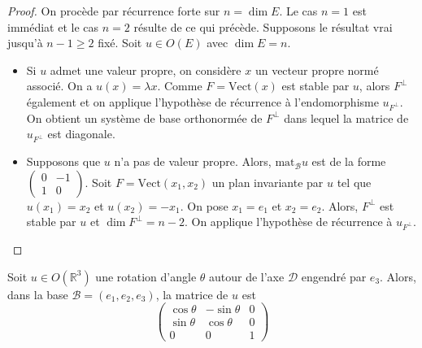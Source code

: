 \begin{proof}

On procède par récurrence forte sur $n = \dim E$. Le cas $n = 1$ est immédiat et le cas $n = 2$ résulte de ce qui précède. Supposons le résultat vrai jusqu'à $n - 1 \geq 2$ fixé. Soit $u \in O(E)$ avec $\dim E = n$.

\begin{itemize}
    \item Si $u$ admet une valeur propre, on considère $x$ un vecteur propre normé associé. On a $u(x) = \lambda x$. Comme $F = \text{Vect}(x)$ est stable par $u$, alors $F^\perp$ également et on applique l'hypothèse de récurrence à l'endomorphisme $u_{F^\perp}$. On obtient un système de base orthonormée de $F^\perp$ dans lequel la matrice de $u_{F^\perp}$ est diagonale.
    \item Supposons que $u$ n'a pas de valeur propre. Alors, $\text{mat}_\mathcal{B} u$ est de la forme $\begin{pmatrix} 0 & -1 \\ 1 & 0 \end{pmatrix}$. Soit $F = \text{Vect}(x_1, x_2)$ un plan invariante par $u$ tel que $u(x_1) = x_2$ et $u(x_2) = -x_1$. On pose $x_1 = e_1$ et $x_2 = e_2$. Alors, $F^\perp$ est stable par $u$ et $\dim F^\perp = n - 2$. On applique l'hypothèse de récurrence à $u_{F^\perp}$.
\end{itemize}

\end{proof}

\begin{example}
\label{ex:1}

Soit $u \in O(\mathbb{R}^3)$ une rotation d'angle $\theta$ autour de l'axe $\mathcal{D}$ engendré par $e_3$. Alors, dans la base $\mathcal{B} = (e_1, e_2, e_3)$, la matrice de $u$ est
\[ \begin{pmatrix} \cos \theta & -\sin \theta & 0 \\ \sin \theta & \cos \theta & 0 \\ 0 & 0 & 1 \end{pmatrix} \]

\end{example}

